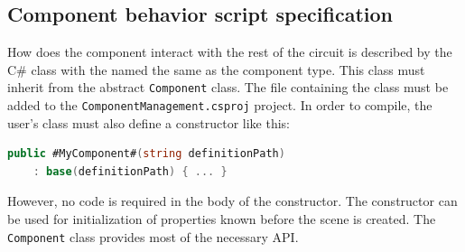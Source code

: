 \subsection{Component behavior script specification} \label{subsec:specs_component_class}
How does the component interact with the rest of the circuit is described by the C\# class with the named the same as the component type. This class must inherit from the abstract \texttt{Component} class. The file containing the class must be added to the \texttt{ComponentManagement.csproj} project. In order to compile, the user's class must also define a constructor like this:

\begin{lstlisting}[language=csharp]
    public #MyComponent#(string definitionPath) 
    : base(definitionPath) { ... }
\end{lstlisting}

However, no code is required in the body of the constructor. The constructor can be used for initialization of properties known before the scene is created. The \texttt{Component} class provides most of the necessary API.

